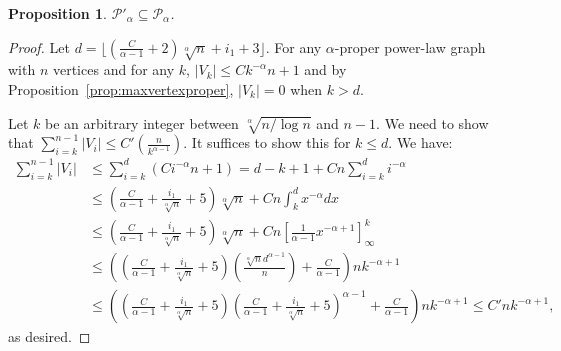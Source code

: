 \documentclass{article}
\newtheorem{proposition}{Proposition}
\theoremstyle{remark}
\newcommand{\PLB}{\ensuremath{ \mathcal{P}_{\alpha}}}
\newcommand{\PLC}{\ensuremath{ \mathcal{P}'_{\alpha}}}
\begin{document}
\begin{proposition}\label{prop:Contained}
$\PLC \subseteq \PLB$.
\end{proposition}
\begin{proof}
Let $d = \lfloor(\frac C{\alpha - 1} + 2)\sqrt[\alpha]{n} + i_1 + 3\rfloor$. For any $\alpha$-proper power-law graph with $n$ vertices and for any $k$, $\vert V_k\vert\leq Ck^{-\alpha}n + 1$ and by Proposition~\ref{prop:maxvertexproper}, $\vert V_k\vert = 0$ when $k > d$.

Let $k$ be an arbitrary integer between $\sqrt[\alpha]{n/\log n}$ and $n-1$. We need to show that $\sum_{i = k}^{n-1} {\vert V_i\vert} \leq C'(\frac{n}{k^{\alpha-1}})$. It suffices to show this for $k\leq d$. We have:
\begin{align*}
  \sum_{i = k}^{n-1} {\vert V_i\vert} & \leq \sum_{i = k}^d(Ci^{-\alpha}n + 1)
    =    d - k + 1 + Cn\sum_{i = k}^d i^{-\alpha}\\
  & \leq \left(\frac C{\alpha - 1} + \frac{i_1}{\sqrt[\alpha]n} + 5\right)\sqrt[\alpha]{n} + Cn\int_k^d x^{-\alpha}dx\\
  & \leq \left(\frac C{\alpha - 1} + \frac{i_1}{\sqrt[\alpha]n} + 5\right)\sqrt[\alpha]{n} + Cn\left[\frac 1{\alpha - 1}x^{-\alpha+1}\right]_\infty^k\\
  & \leq \left(\left(\frac C{\alpha - 1} + \frac{i_1}{\sqrt[\alpha]n} + 5\right)\left(\frac{\sqrt[\alpha]nd^{\alpha-1}}n\right) + \frac {C}{\alpha - 1}\right)nk^{-\alpha +1}\\
  & \leq \left(\left(\frac C{\alpha - 1} + \frac{i_1}{\sqrt[\alpha]n} + 5\right)\left(\frac C{\alpha-1} + \frac{i_1}{\sqrt[\alpha]n} + 5\right)^{\alpha - 1} + \frac{C}{\alpha - 1}\right)nk^{-\alpha+1} \leq C'nk^{-\alpha+1},
\end{align*}
as desired.
\end{proof}
\end{document}
